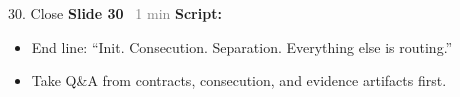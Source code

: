 \documentclass[aspectratio=169]{beamer}
\newcommand{\syncline}[2]{\textbf{#1} \hfill \textcolor{gray}{#2}}
\begin{document}
\begin{frame}{30. Close}
\syncline{Slide 30}{~1 min}
\textbf{Script:}
\begin{itemize}
  \item End line: ``Init. Consecution. Separation. Everything else is routing.''
  \item Take Q\&A from contracts, consecution, and evidence artifacts first.
\end{itemize}
\end{frame}
\end{document}
